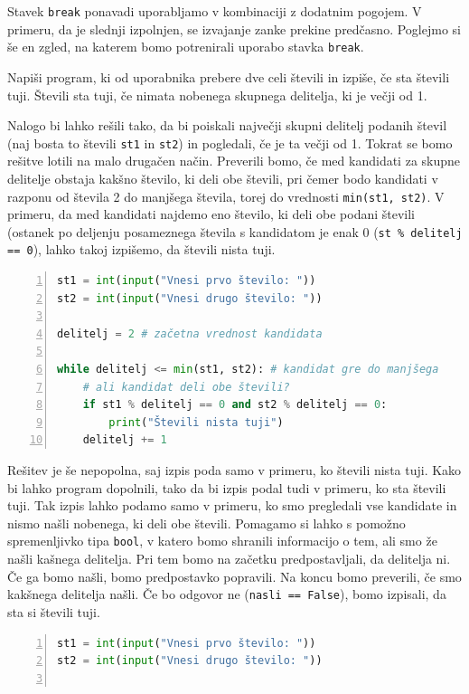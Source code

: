 Stavek \texttt{break} ponavadi uporabljamo v kombinaciji z dodatnim pogojem. V primeru, da je slednji izpolnjen, se izvajanje zanke prekine predčasno. Poglejmo si še en zgled, na katerem bomo potrenirali uporabo stavka \texttt{break}. 

\begin{zgled}
Napiši program, ki od uporabnika prebere dve celi števili in izpiše, če sta števili tuji. Števili sta tuji, če nimata nobenega skupnega delitelja, ki je večji od 1.
\end{zgled}
\begin{resitev}
Nalogo bi lahko rešili tako, da bi poiskali največji skupni delitelj podanih števil (naj bosta to števili \texttt{st1} in \texttt{st2}) in pogledali, če je ta večji od 1. Tokrat se bomo rešitve lotili na malo drugačen način. Preverili bomo, če med kandidati za skupne delitelje obstaja kakšno število, ki deli obe števili, pri čemer bodo kandidati v razponu od števila 2 do manjšega števila, torej do vrednosti \texttt{min(st1, st2)}. V primeru, da med kandidati najdemo eno število, ki deli obe podani števili (ostanek po deljenju posameznega števila s kandidatom je enak 0 (\texttt{st \% delitelj == 0}), lahko takoj izpišemo, da števili nista tuji.
\begin{lstlisting}[language=Python, showstringspaces=false,numbers=left]
st1 = int(input("Vnesi prvo število: "))
st2 = int(input("Vnesi drugo število: "))

delitelj = 2 # začetna vrednost kandidata

while delitelj <= min(st1, st2): # kandidat gre do manjšega
    # ali kandidat deli obe števili?
    if st1 % delitelj == 0 and st2 % delitelj == 0:
        print("Števili nista tuji")
    delitelj += 1
\end{lstlisting}
Rešitev je še nepopolna, saj izpis poda samo v primeru, ko števili nista tuji. Kako bi lahko program dopolnili, tako da bi izpis podal tudi v primeru, ko sta števili tuji. Tak izpis lahko podamo samo v primeru, ko smo pregledali vse kandidate in nismo našli nobenega, ki deli obe števili. Pomagamo si lahko s pomožno spremenljivko tipa \texttt{bool}, v katero bomo shranili informacijo o tem, ali smo že našli kašnega delitelja. Pri tem bomo na začetku predpostavljali, da delitelja ni. Če ga bomo našli, bomo predpostavko popravili. Na koncu bomo preverili, če smo kakšnega delitelja našli. Če bo odgovor ne (\texttt{nasli == False}), bomo izpisali, da sta si števili tuji.
\begin{lstlisting}[language=Python, showstringspaces=false,numbers=left]
st1 = int(input("Vnesi prvo število: "))
st2 = int(input("Vnesi drugo število: "))


\end{lstlisting}
\end{resitev}
